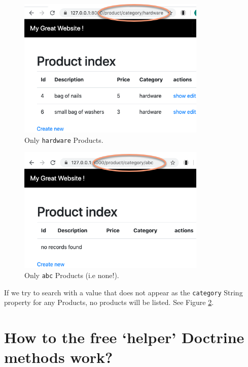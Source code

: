 \documentclass[a4paperpaper,openright]{book}
\begin{document}
\begin{figure}
\centering
\includegraphics[width=0.8\textwidth,height=\textheight]{./tex2pdf.-8a1528da847c818a/7a346ce12ff5373b1976ddd46a0c555b94f421c1.png}
\caption{Only \texttt{hardware} Products. \label{query4}}
\end{figure}

\begin{figure}
\centering
\includegraphics[width=0.8\textwidth,height=\textheight]{./tex2pdf.-8a1528da847c818a/f58a05139ec5ba921032e06d20b97101894c9079.png}
\caption{Only \texttt{abc} Products (i.e none!). \label{query5}}
\end{figure}

If we try to search with a value that does not appear as the
\texttt{category} String property for any Products, no products will be
listed. See Figure \ref{query5}.

\hypertarget{how-to-the-free-helper-doctrine-methods-work}{%
\chapter{How to the free `helper' Doctrine methods
work?}\label{how-to-the-free-helper-doctrine-methods-work}}
\end{document}
